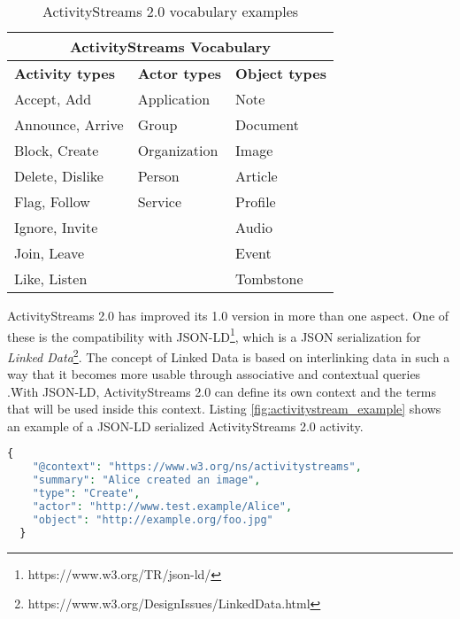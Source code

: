 \begin{table}[H]
  \centering
  \begin{tabular}{|p{4cm}|p{4cm}|p{4cm}| }
    \hline
    \multicolumn{3}{|c|}{ActivityStreams Vocabulary} \\
    \hline
    \textbf{Activity types} & \textbf{Actor types} & \textbf{Object types} \\
    \hline
    \hline
      Accept, Add & Application & Note \\ 
      Announce, Arrive & Group & Document \\ 
      Block, Create & Organization & Image \\
      Delete, Dislike & Person & Article \\
      Flag, Follow & Service & Profile \\
      Ignore, Invite & & Audio \\
      Join, Leave & & Event \\
      Like, Listen & & Tombstone \\
      \hline
  \end{tabular}
  \caption{ActivityStreams 2.0 vocabulary examples}
  \label{table:activitystreams_vocabulary}
\end{table}

ActivityStreams 2.0 has improved its 1.0 version in more than one aspect. One of these is the compatibility with JSON-LD\footnote{https://www.w3.org/TR/json-ld/}, which is a JSON serialization for \emph{Linked Data}\footnote{https://www.w3.org/DesignIssues/LinkedData.html}. The concept of Linked Data is based on interlinking data in such a way that it becomes more usable through associative and contextual queries \cite{berners-lee_2006}.\. With JSON-LD, ActivityStreams 2.0 can define its own context and the terms that will be used inside this context. Listing \ref{fig:activitystream_example} shows an example of a JSON-LD serialized ActivityStreams 2.0 activity. 

\lstset{style=JSONStyle}
\begin{lstlisting}[language=PHP, caption=Example of a Create activity using JSON-LD \cite{snell_prodromou_2017}, label=fig:activitystream_example, float=h]
  {
    "@context": "https://www.w3.org/ns/activitystreams",
    "summary": "Alice created an image",
    "type": "Create",
    "actor": "http://www.test.example/Alice",
    "object": "http://example.org/foo.jpg"
  }
\end{lstlisting}

